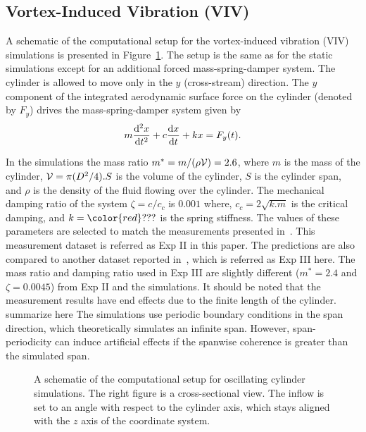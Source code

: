 \subsection{Vortex-Induced Vibration (VIV)}
\label{sec:VIV}
%
A schematic of the computational setup for the vortex-induced vibration (VIV)
simulations is presented in Figure~\ref{fig:VIVmodel}. The setup is the same as
for the static simulations except for an additional forced mass-spring-damper
system. The cylinder is allowed to move only in the $y$ (cross-stream)
direction. The $y$ component of the integrated aerodynamic surface force on the
cylinder (denoted by $F_y$) drives the mass-spring-damper system given by
%
\begin{equation}
  m \frac{{\rm d}^2 x}{{\rm d}t^2} + c \frac{{\rm d} x}{{\rm d}t} + k x = F_y(t).
  \label{eq:mass-spring-damper}
\end{equation}
 
In the simulations the mass ratio $m^*=m/(\rho {\cal V})=2.6$, where $m$ is the
mass of the cylinder, ${\cal V}=\pi (D^2/4) . S$ is the volume of the cylinder,
$S$ is the cylinder span, and $\rho$ is the density of the fluid flowing over
the cylinder. The mechanical damping ratio of the system $\zeta = c/c_c$ is
$0.001$ where, $c_c=2\sqrt{k.m}$ is the critical damping, and
$k={\color{red}???}$ is the spring stiffness. The values of these parameters
are selected to match the measurements presented in~\cite{franzini2013one}.
This measurement dataset is referred as Exp II in this paper. The predictions
are also compared to another dataset reported in~\cite{khalak1997fluid}, which
is referred as Exp III here. The mass ratio and damping ratio used in Exp III
are slightly different ($m^*=2.4$ and $\zeta=0.0045$) from Exp II and the
simulations. It should be noted that the measurement results have end effects
due to the finite length of the cylinder. {\color{red} summarize here} The
simulations use periodic boundary conditions in the span direction, which
theoretically simulates an infinite span. However, span-periodicity can induce
artificial effects if the spanwise coherence is greater than the simulated
span.
%
\begin{figure}[htb!]
  \caption{A schematic of the computational setup for oscillating cylinder
    simulations. The right figure is a cross-sectional view.  The inflow is set
    to an angle with respect to the cylinder axis, which stays aligned with the $z$
    axis of the coordinate system.}
  \label{fig:VIVmodel}
\end{figure}

